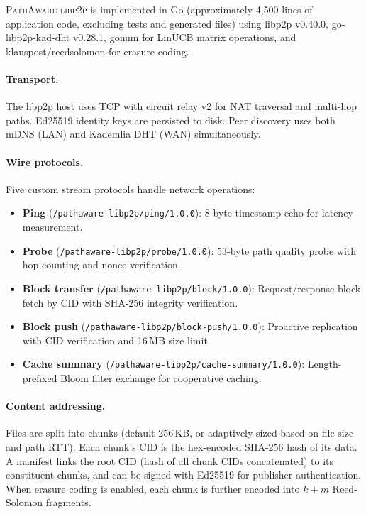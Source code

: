 \documentclass[sigconf,nonacm]{acmart}
\begin{document}
\textsc{PathAware-libp2p} is implemented in Go (approximately 4{,}500 lines of application code, excluding tests and generated files) using libp2p v0.40.0, go-libp2p-kad-dht v0.28.1, gonum for LinUCB matrix operations, and klauspost/reedsolomon for erasure coding.

\paragraph{Transport.} The libp2p host uses TCP with circuit relay v2 for NAT traversal and multi-hop paths. Ed25519 identity keys are persisted to disk. Peer discovery uses both mDNS (LAN) and Kademlia DHT (WAN) simultaneously.

\paragraph{Wire protocols.} Five custom stream protocols handle network operations:
\begin{itemize}
\item \textbf{Ping} (\texttt{/pathaware-libp2p/ping/1.0.0}): 8-byte timestamp echo for latency measurement.
\item \textbf{Probe} (\texttt{/pathaware-libp2p/probe/1.0.0}): 53-byte path quality probe with hop counting and nonce verification.
\item \textbf{Block transfer} (\texttt{/pathaware-libp2p/block/1.0.0}): Request/response block fetch by CID with SHA-256 integrity verification.
\item \textbf{Block push} (\texttt{/pathaware-libp2p/block-push/1.0.0}): Proactive replication with CID verification and 16\,MB size limit.
\item \textbf{Cache summary} (\texttt{/pathaware-libp2p/cache-summary/1.0.0}): Length-prefixed Bloom filter exchange for cooperative caching.
\end{itemize}

\paragraph{Content addressing.} Files are split into chunks (default 256\,KB, or adaptively sized based on file size and path RTT). Each chunk's CID is the hex-encoded SHA-256 hash of its data. A manifest links the root CID (hash of all chunk CIDs concatenated) to its constituent chunks, and can be signed with Ed25519 for publisher authentication. When erasure coding is enabled, each chunk is further encoded into $k{+}m$ Reed-Solomon fragments.
\end{document}
